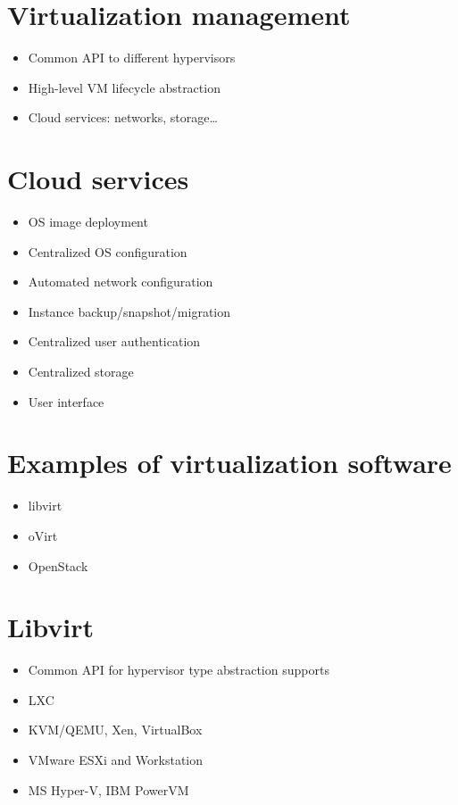 \documentclass[11pt]{article}
\begin{document}
\section*{Virtualization management}
\label{sec:org5e1f11d}
\begin{itemize}
\item Common API to different hypervisors
\item High-level VM lifecycle abstraction
\item Cloud services: networks, storage\ldots{}
\end{itemize}

\section*{Cloud services}
\label{sec:orgb6ae2d0}
\begin{itemize}
\item OS image deployment
\item Centralized OS configuration
\item Automated network configuration
\item Instance backup/snapshot/migration
\item Centralized user authentication
\item Centralized storage
\item User interface
\end{itemize}

\section*{Examples of virtualization software}
\label{sec:org96d9213}
\begin{itemize}
\item libvirt
\item oVirt
\item OpenStack
\end{itemize}

\section*{Libvirt}
\label{sec:orgc8d5c5f}
\begin{itemize}
\item Common API for hypervisor type abstraction supports
\item LXC
\item KVM/QEMU, Xen, VirtualBox
\item VMware ESXi and Workstation
\item MS Hyper-V, IBM PowerVM
\end{itemize}
\end{document}
